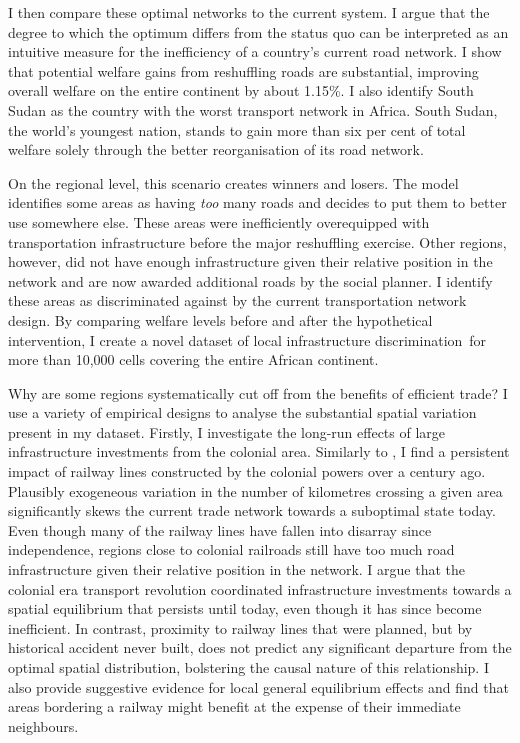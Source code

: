 \documentclass[11pt, oneside]{article}   	%
\begin{document}
I then compare these optimal networks to the current system. I argue that the degree to which the optimum differs from the status quo can be interpreted as an intuitive measure for the inefficiency of a country's current road network. I show that potential welfare gains from reshuffling roads are substantial, improving overall welfare on the entire continent by about 1.15\%. I also identify South Sudan as the country with the worst transport network in Africa. South Sudan, the world's youngest nation, stands to gain more than six per cent of total welfare solely through the better reorganisation of its road network.

On the regional level, this scenario creates winners and losers. The model identifies some areas as having \emph{too} many roads and decides to put them to better use somewhere else. These areas were inefficiently overequipped with transportation infrastructure before the major reshuffling exercise. Other regions, however, did not have enough infrastructure given their relative position in the network and are now awarded additional roads by the social planner. I identify these areas as discriminated against by the current transportation network design. By comparing welfare levels before and after the hypothetical intervention, I create a novel dataset of local infrastructure discrimination for more than 10,000 cells covering the entire African continent.

Why are some regions systematically cut off from the benefits of efficient trade? I use a variety of empirical designs to analyse the substantial spatial variation present in my dataset. Firstly, I investigate the long-run effects of large infrastructure investments from the colonial area. Similarly to \cite{Jedwab_PermanentEffectsTransportation_2016a}, I find a persistent impact of railway lines constructed by the colonial powers over a century ago. Plausibly exogeneous variation in the number of kilometres crossing a given area significantly skews the current trade network towards a suboptimal state today. Even though many of the railway lines have fallen into disarray since independence, regions close to colonial railroads still have too much road infrastructure given their relative position in the network. I argue that the colonial era transport revolution coordinated infrastructure investments towards a spatial equilibrium that persists until today, even though it has since become inefficient. In contrast, proximity to railway lines that were planned, but by historical accident never built, does not predict any significant departure from the optimal spatial distribution, bolstering the causal nature of this relationship. I also provide suggestive evidence for local general equilibrium effects and find that areas bordering a railway might benefit at the expense of their immediate neighbours.
\end{document}
